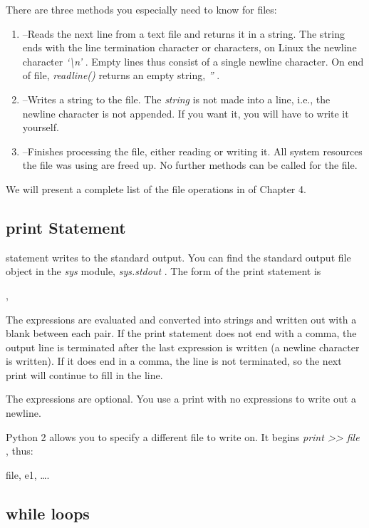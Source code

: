 There are three methods you
especially need to know for files:

\begin{enumerate}
\tightlist
\item
   --Reads the
  next line from a text file and returns it in a string. The string ends
  with the line termination character or characters, on Linux the
  newline character \emph{`\textbackslash{}n'} . Empty lines thus
  consist of a single newline character. On end of file,
  \emph{readline()} returns an empty string, \emph{''} .
\item
   --Writes
  a string to the file. The \emph{string} is not made into a line, i.e.,
  the newline character is not appended. If you want it, you will have
  to write it yourself.
\item
   --Finishes
  processing the file, either reading or writing it. All system
  resources the file was using are freed up. No further methods can be
  called for the file.
\end{enumerate}

We will present a complete list of
the file operations in \href{chap4.html\#22958}{} of Chapter 4.

\subsection{print Statement}
\label{print-statement}

 statement writes
to the standard output. You can find the standard output file object in
the \emph{sys} module, \emph{sys.stdout} . The form of the print
statement is



 ,

The expressions are evaluated and
converted into strings and written out with a blank between each pair.
If the print statement does not end with a comma, the output line is
terminated after the last expression is written (a newline character is
written). If it does end in a comma, the line is not terminated, so the
next print will continue to fill in the line.

The expressions are optional. You
use a print with no expressions to write out a newline.

Python 2 allows you to specify a
different file to write on. It begins \emph{print
\textgreater{}\textgreater{} file} , thus:


file, e1, \ldots{}.

\subsection{while loops}
\label{while-loops}


